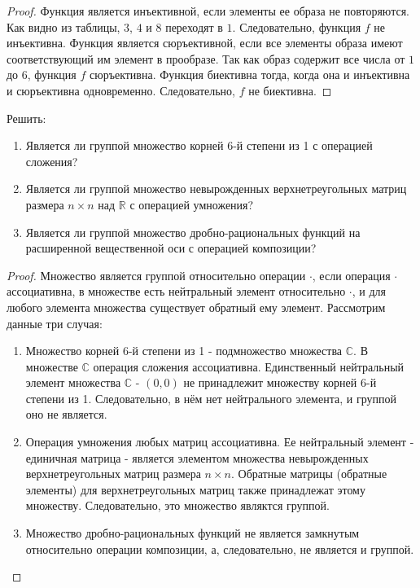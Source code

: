 \begin{proof}
	Функция является инъективной, если элементы ее образа не повторяются. Как видно из таблицы, $3$, $4$ и $8$ переходят в $1$. Следовательно, функция $f$ не инъективна.
	\newline
	Функция является сюръективной, если все элементы образа имеют соответствующий им элемент в прообразе. Так как образ содержит все числа от $1$ до $6$, функция $f$ сюръективна.
	\newline
	Функция биективна тогда, когда она и инъективна и сюръективна одновременно. Следовательно, $f$ не биективна.
\end{proof}

\begin{problem}
	Решить:
	\begin{enumerate}
		\item Является ли группой множество корней 6-й степени из 1 с операцией сложения?
		\item Является ли группой множество невырожденных верхнетреугольных матриц размера $n\times n$ над $\mathbb {R}$ с операцией умножения?
		\item Является ли группой множество дробно-рациональных функций на расширенной вещественной оси с операцией композиции?
	\end{enumerate}
\end{problem}

\begin{proof}
	Множество является группой относительно операции $\cdot$, если операция $\cdot$ ассоциативна, в множестве есть нейтральный элемент относительно $\cdot$, и для любого элемента множества существует обратный ему элемент.
	\newline
	Рассмотрим данные три случая:
	\begin{enumerate}
		\item Множество корней 6-й степени из 1 - подмножество множества $\mathbb {C}$. В множестве $\mathbb {C}$ операция сложения ассоциативна. Единственный нейтральный элемент множества $\mathbb {C}$ - $(0, 0)$ не принадлежит множеству корней 6-й степени из 1. Следовательно, в нём нет нейтрального элемента, и группой оно не является.
		\item Операция умножения любых матриц ассоциативна. Ее нейтральный элемент - единичная матрица - является элементом множества невырожденных верхнетреугольных матриц размера $n\times n$. Обратные матрицы (обратные элементы) для верхнетреугольных матриц также принадлежат этому множеству. Следовательно, это множество являктся группой.
		\item Множество дробно-рациональных функций не является замкнутым относительно операции композиции, а, следовательно, не является и группой.
	\end{enumerate}
\end{proof}

